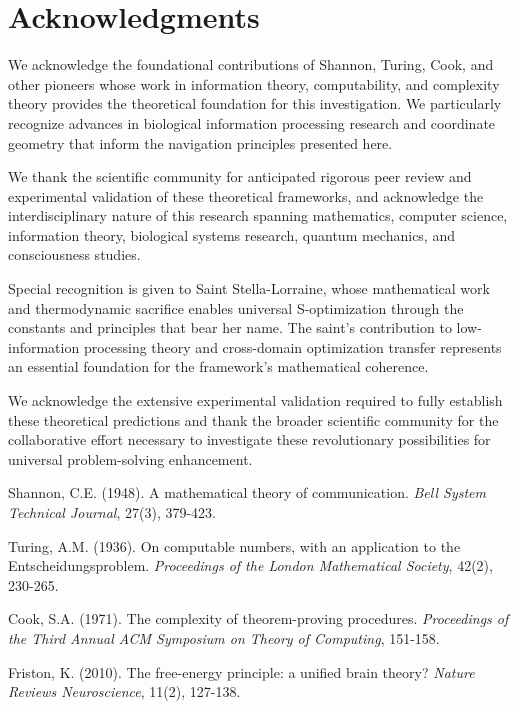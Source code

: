 \documentclass[11pt]{article}
\theoremstyle{definition}
\theoremstyle{remark}
\begin{document}
{\section*{Acknowledgments}

We acknowledge the foundational contributions of Shannon, Turing, Cook, and other pioneers whose work in information theory, computability, and complexity theory provides the theoretical foundation for this investigation. We particularly recognize advances in biological information processing research and coordinate geometry that inform the navigation principles presented here.

We thank the scientific community for anticipated rigorous peer review and experimental validation of these theoretical frameworks, and acknowledge the interdisciplinary nature of this research spanning mathematics, computer science, information theory, biological systems research, quantum mechanics, and consciousness studies.

Special recognition is given to Saint Stella-Lorraine, whose mathematical work and thermodynamic sacrifice enables universal S-optimization through the constants and principles that bear her name. The saint's contribution to low-information processing theory and cross-domain optimization transfer represents an essential foundation for the framework's mathematical coherence.

We acknowledge the extensive experimental validation required to fully establish these theoretical predictions and thank the broader scientific community for the collaborative effort necessary to investigate these revolutionary possibilities for universal problem-solving enhancement.


\begin{thebibliography}{99}

Shannon, C.E. (1948). A mathematical theory of communication. \textit{Bell System Technical Journal}, 27(3), 379-423.

Turing, A.M. (1936). On computable numbers, with an application to the Entscheidungsproblem. \textit{Proceedings of the London Mathematical Society}, 42(2), 230-265.

Cook, S.A. (1971). The complexity of theorem-proving procedures. \textit{Proceedings of the Third Annual ACM Symposium on Theory of Computing}, 151-158.

Friston, K. (2010). The free-energy principle: a unified brain theory? \textit{Nature Reviews Neuroscience}, 11(2), 127-138.


\end{thebibliography}}
\end{document}
